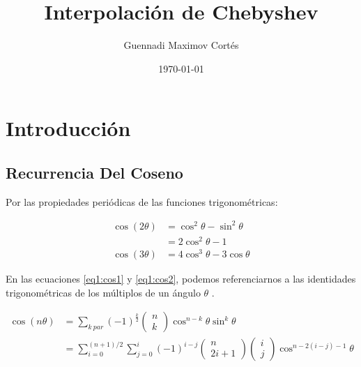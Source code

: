 \documentclass[14pt,letterpaper]{report}
\author{Guennadi Maximov Cortés}
\date{\today}
\title{Interpolación de Chebyshev}
\begin{document}
	\maketitle
	\tableofcontents
	\newpage

	\chapter{Introducción} %
		\newpage
		\section{Recurrencia Del Coseno} %
			Por las propiedades periódicas de las funciones trigonométricas:

			\begin{align}
				\label{eq1:cos1}
				\cos\left(2\theta\right) &= \cos^{2}\theta - \sin^{2} \theta\\
				&= 2\cos^{2} \theta - 1\nonumber\\
				\label{eq1:cos2}
				\cos\left(3\theta\right) &= 4\cos^{3}\theta-3\cos\theta
			\end{align}

			En las ecuaciones \ref{eq1:cos1} y \ref{eq1:cos2}, podemos referenciarnos
			a las identidades trigonométricas de los múltiplos de un ángulo ${\theta}$
			\cite{TRIGID:1}.

			\begin{equation}
				\begin{aligned}
					\label{eq2:cos1}
					\cos\left(n\theta\right) &= \sum_{k\ par} \left(-1\right)^{\frac{k}{2}}
					\begin{pmatrix}
						n\\
						k
					\end{pmatrix}
					\cos^{n-k}\theta\sin^{k}\theta\\
					&= \sum_{i=0}^{\left(n+1\right) \slash 2} \sum_{j=0}^{i} \left(-1\right)^{i-j}
					\begin{pmatrix}
						n\\
						2i + 1
					\end{pmatrix}
					\begin{pmatrix}
						i\\
						j
					\end{pmatrix}
					\cos^{n-2\left(i-j\right)-1}\theta
				\end{aligned}
			\end{equation}
\end{document}
